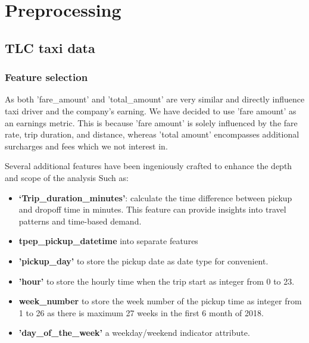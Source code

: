 \documentclass[11pt]{article}
\begin{document}
\section{Preprocessing}
\subsection{TLC taxi data}
    \subsubsection{Feature selection}
        As both ’fare\_amount’ and ’total\_amount’ are very similar and directly influence taxi driver and the company’s earning. We have decided to use ’fare amount’ as an earnings metric. This is because ’fare amount’ is solely influenced by the fare rate, trip duration, and distance, whereas 'total amount’ encompasses additional surcharges and fees which we not interest in.
        
        
        Several additional features have been ingeniously crafted to enhance the depth and scope of the analysis Such as:
        \begin{itemize}
            \item \textbf{‘Trip\_duration\_minutes’}: calculate the time difference between pickup and dropoff time in minutes. This feature can provide insights into travel patterns and time-based demand.     
            
            \item \textbf{tpep\_pickup\_datetime} into separate features
            
            \item \textbf{'pickup\_day'} to store the pickup date as date type for convenient.
            
            \item \textbf{'hour'} to store the hourly time when the trip start as integer from 0 to 23. 
            
            \item \textbf{week\_number} to store the week number of the pickup time as integer from 1 to 26 as there is maximum 27 weeks in the first 6 month of 2018.
            
            \item \textbf{'day\_of\_the\_week'} a weekday/weekend indicator attribute.
        \end{itemize}
\end{document}
